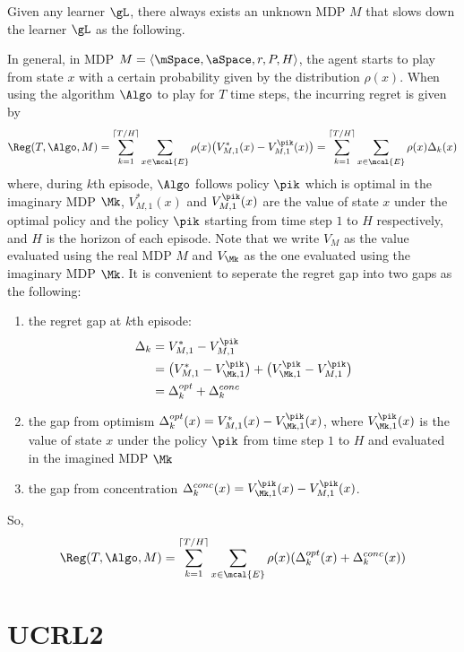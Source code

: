 Given any learner $\gL$, there always exists an unknown MDP $M$ that slows down the learner $\gL$ as the following.

    In general, in MDP $M=\langle\mSpace,\aSpace,r,P,H\rangle$, the agent starts to play from state $x$ with a certain probability given by the distribution $\rho(x)$. When using the algorithm $\Algo$ to play for $T$ time steps, the incurring regret is given by
    \begin{align}
        \Reg(T,\Algo,M)=\sum_{k=1}^{\lceil T/H\rceil}\sum_{x\in\mcal{E}}\rho(x)\big(V_{M,1}^*(x) -V_{M,1}^{\pik}(x)\big) =\sum_{k=1}^{\lceil T/H\rceil}\sum_{x\in\mcal{E}}\rho(x)\Delta_k(x)
    \end{align}
    where, during $k$th episode, $\Algo$ follows policy $\pik$ which is optimal in the imaginary MDP $\Mk$, $V^*_{M,1}(x)$ and $V_{M,1}^{\pik}(x)$ are the value of state $x$ under the optimal policy and the policy $\pik$ starting from time step $1$ to $H$ respectively, and $H$ is the horizon of each episode.
    Note that we write $V_M$ as the value evaluated using the real MDP $M$ and $V_{\Mk}$ as the one evaluated using the imaginary MDP $\Mk$. It is convenient to seperate the regret gap into two gaps as the following:
    \begin{enumerate}
        \item the regret gap at $k$th episode:
        \begin{align*}
        \Delta_k &=V_{M,1}^* -V_{M,1}^{\pik} \\
        &=\big(V^*_{M,1} -V^{\pik}_{\Mk,1}\big) +\big(V^{\pik}_{\Mk,1} -V_{M,1}^{\pik}\big) \\
        &=\Delta_k^{opt}+\Delta_k^{conc}
        \end{align*}
    \item the gap from optimism $\Delta_k^{opt}(x)=V^*_{M,1}(x) -V^{\pik}_{\Mk,1}(x)$, where $V^{\pik}_{\Mk,1}(x)$ is the value of state $x$ under the policy $\pik$ from time step $1$ to $H$ and evaluated in the imagined MDP $\Mk$
    \item the gap from concentration $\Delta_k^{conc}(x)=V^{\pik}_{\Mk,1}(x) -V_{M,1}^{\pik}(x)$.
    \end{enumerate}
    So,
    \begin{equation}
    \label{eq:eq_6}
    \Reg(T,\Algo,M)= \sum_{k=1}^{\lceil T/H\rceil}\sum_{x\in\mcal{E}}\rho(x)(\Delta_k^{opt}(x)+\Delta_k^{conc}(x))
    \end{equation}

\section{UCRL2}
\label{sec:ucrl2}

